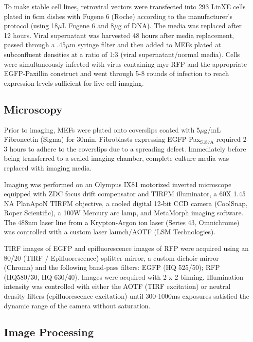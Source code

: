 \documentclass[10pt]{article}
\begin{document}
To make stable cell lines, retroviral vectors were transfected into 293 LinXE
cells plated in 6cm dishes with Fugene 6 (Roche) according to the manufacturer's
protocol (using 18$\mu$L Fugene 6 and 8$\mu$g of DNA). The media was replaced
after 12 hours. Viral supernatant was harvested 48 hours after media
replacement, passed through a .45$\mu$m syringe filter and then added to MEFs
plated at subconfluent densities at a ratio of 1:3 (viral supernatant/normal
media). Cells were simultaneously infected with virus containing myr-RFP and
the appropriate EGFP-Paxillin construct and went through 5-8 rounds of infection
to reach expression levels sufficient for live cell imaging.

\subsection*{Microscopy}

Prior to imaging, MEFs were plated onto coverslips coated with 5$\mu$g/mL
Fibronectin (Sigma) for 30min. Fibroblasts expressing EGFP-Pax$_{\textrm{S187A}}$
required 2-3 hours to adhere to the coverslips due to a spreading defect.
Immediately before being transferred to a sealed imaging chamber, complete
culture media was replaced with imaging media. 

Imaging was performed on an Olympus IX81 motorized inverted microscope equipped
with ZDC focus drift compensator and TIRFM illuminator, a 60X 1.45 NA PlanApoN
TIRFM objective, a cooled digital 12-bit CCD camera (CoolSnap, Roper
Scientific), a 100W Mercury arc lamp, and MetaMorph imaging software. The 488nm
laser line from a Krypton-Argon ion laser (Series 43, Omnichrome) was controlled
with a custom laser launch/AOTF (LSM Technologies).  

TIRF images of EGFP and epifluorescence images of RFP were acquired using an
80/20 (TIRF / Epifluorescence) splitter mirror, a custom dichoic mirror (Chroma)
and the following band-pass filters: EGFP (HQ 525/50); RFP (HQ580/30, HQ
630/40). Images were acquired with 2 x 2 binning. Illumination intensity was
controlled with either the AOTF (TIRF excitation) or neutral density filters
(epifluorescence excitation) until 300-1000ms exposures satisfied the dynamic
range of the camera without saturation. 

\subsection*{Image Processing}
\end{document}
